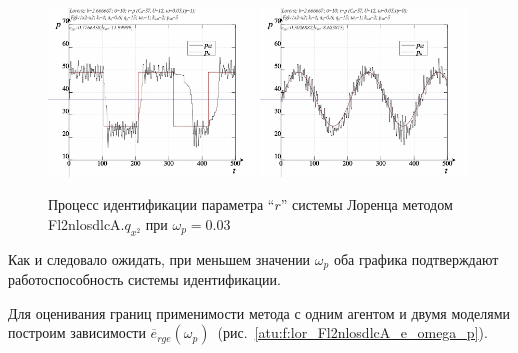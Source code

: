 \begin{figure}[ht!]
  \centerline{
    \includegraphics[width=0.49\textwidth]{p/cha/lor/Fl2nlosdlcA/Fl2nlosdlcA-p_xz_1_wp003.png}
    \hfill
    \includegraphics[width=0.49\textwidth]{p/cha/lor/Fl2nlosdlcA/Fl2nlosdlcA-p_xz_0_wp003.png}
  }
  \caption{Процесс идентификации параметра ``$r$'' системы Лоренца методом Fl2nlosdlcA.$q_{x^2}$ при $\omega_p=0.03$}
  \label{atu:f:lor_id_Fl2nlosdlcA_003}
\end{figure}

Как и следовало ожидать, при меньшем значении $\omega_p$
оба графика подтверждают работоспособность системы идентификации.

Для оценивания границ применимости метода с одним агентом
и двумя моделями построим зависимости
$\overline{e}_{rge}(\omega_p)$~(рис.~\ref{atu:f:lor_Fl2nlosdlcA_e_omega_p}).

